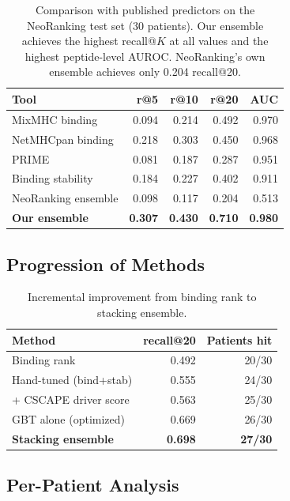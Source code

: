 \documentclass[11pt,twocolumn]{article}
\begin{document}
\begin{table}[ht]
\centering
\footnotesize
\begin{tabular}{@{}lrrrr@{}}
\toprule
Tool & r@5 & r@10 & r@20 & AUC \\
\midrule
MixMHC binding & 0.094 & 0.214 & 0.492 & 0.970 \\
NetMHCpan binding & 0.218 & 0.303 & 0.450 & 0.968 \\
PRIME & 0.081 & 0.187 & 0.287 & 0.951 \\
Binding stability & 0.184 & 0.227 & 0.402 & 0.911 \\
NeoRanking ensemble & 0.098 & 0.117 & 0.204 & 0.513 \\
\textbf{Our ensemble} & \textbf{0.307} & \textbf{0.430} & \textbf{0.710} & \textbf{0.980} \\
\bottomrule
\end{tabular}
\caption{Comparison with published predictors on the NeoRanking test set (30 patients). Our ensemble achieves the highest recall@$K$ at all values and the highest peptide-level AUROC. NeoRanking's own ensemble achieves only 0.204 recall@20.}
\end{table}

\subsection{Progression of Methods}

\begin{table}[ht]
\centering
\footnotesize
\begin{tabular}{@{}lrr@{}}
\toprule
Method & recall@20 & Patients hit \\
\midrule
Binding rank & 0.492 & 20/30 \\
Hand-tuned (bind+stab) & 0.555 & 24/30 \\
+ CSCAPE driver score & 0.563 & 25/30 \\
GBT alone (optimized) & 0.669 & 26/30 \\
\textbf{Stacking ensemble} & \textbf{0.698} & \textbf{27/30} \\
\bottomrule
\end{tabular}
\caption{Incremental improvement from binding rank to stacking ensemble.}
\end{table}

\subsection{Per-Patient Analysis}
\end{document}
